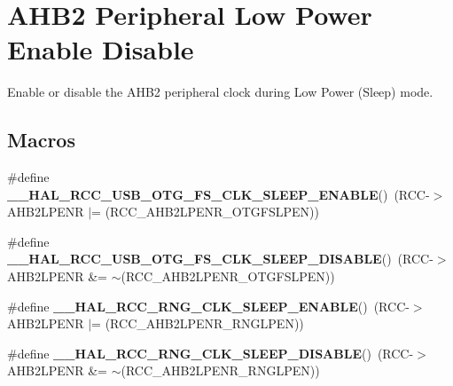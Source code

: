 \hypertarget{group___r_c_c_ex___a_h_b2___low_power___enable___disable}{}\section{A\+H\+B2 Peripheral Low Power Enable Disable}
\label{group___r_c_c_ex___a_h_b2___low_power___enable___disable}


Enable or disable the A\+H\+B2 peripheral clock during Low Power (Sleep) mode.  


\subsection*{Macros}
\begin{DoxyCompactItemize}
\item 
\#define {\bfseries \+\_\+\+\_\+\+H\+A\+L\+\_\+\+R\+C\+C\+\_\+\+U\+S\+B\+\_\+\+O\+T\+G\+\_\+\+F\+S\+\_\+\+C\+L\+K\+\_\+\+S\+L\+E\+E\+P\+\_\+\+E\+N\+A\+B\+LE}()~(R\+CC-\/$>$A\+H\+B2\+L\+P\+E\+NR $\vert$= (R\+C\+C\+\_\+\+A\+H\+B2\+L\+P\+E\+N\+R\+\_\+\+O\+T\+G\+F\+S\+L\+P\+EN))\hypertarget{group___r_c_c_ex___a_h_b2___low_power___enable___disable_ga043ce43b32ec91f2b032f746509079cd}{}\label{group___r_c_c_ex___a_h_b2___low_power___enable___disable_ga043ce43b32ec91f2b032f746509079cd}

\item 
\#define {\bfseries \+\_\+\+\_\+\+H\+A\+L\+\_\+\+R\+C\+C\+\_\+\+U\+S\+B\+\_\+\+O\+T\+G\+\_\+\+F\+S\+\_\+\+C\+L\+K\+\_\+\+S\+L\+E\+E\+P\+\_\+\+D\+I\+S\+A\+B\+LE}()~(R\+CC-\/$>$A\+H\+B2\+L\+P\+E\+NR \&= $\sim$(R\+C\+C\+\_\+\+A\+H\+B2\+L\+P\+E\+N\+R\+\_\+\+O\+T\+G\+F\+S\+L\+P\+EN))\hypertarget{group___r_c_c_ex___a_h_b2___low_power___enable___disable_ga4d8498985e2b924e443065da8a2890b2}{}\label{group___r_c_c_ex___a_h_b2___low_power___enable___disable_ga4d8498985e2b924e443065da8a2890b2}

\item 
\#define {\bfseries \+\_\+\+\_\+\+H\+A\+L\+\_\+\+R\+C\+C\+\_\+\+R\+N\+G\+\_\+\+C\+L\+K\+\_\+\+S\+L\+E\+E\+P\+\_\+\+E\+N\+A\+B\+LE}()~(R\+CC-\/$>$A\+H\+B2\+L\+P\+E\+NR $\vert$= (R\+C\+C\+\_\+\+A\+H\+B2\+L\+P\+E\+N\+R\+\_\+\+R\+N\+G\+L\+P\+EN))\hypertarget{group___r_c_c_ex___a_h_b2___low_power___enable___disable_ga03ec704e7309312630b3a572fb6f8856}{}\label{group___r_c_c_ex___a_h_b2___low_power___enable___disable_ga03ec704e7309312630b3a572fb6f8856}

\item 
\#define {\bfseries \+\_\+\+\_\+\+H\+A\+L\+\_\+\+R\+C\+C\+\_\+\+R\+N\+G\+\_\+\+C\+L\+K\+\_\+\+S\+L\+E\+E\+P\+\_\+\+D\+I\+S\+A\+B\+LE}()~(R\+CC-\/$>$A\+H\+B2\+L\+P\+E\+NR \&= $\sim$(R\+C\+C\+\_\+\+A\+H\+B2\+L\+P\+E\+N\+R\+\_\+\+R\+N\+G\+L\+P\+EN))\hypertarget{group___r_c_c_ex___a_h_b2___low_power___enable___disable_gae85e4ea41a2b365ee27c459ddcb9a3a1}{}\label{group___r_c_c_ex___a_h_b2___low_power___enable___disable_gae85e4ea41a2b365ee27c459ddcb9a3a1}


\end{DoxyCompactItemize}
